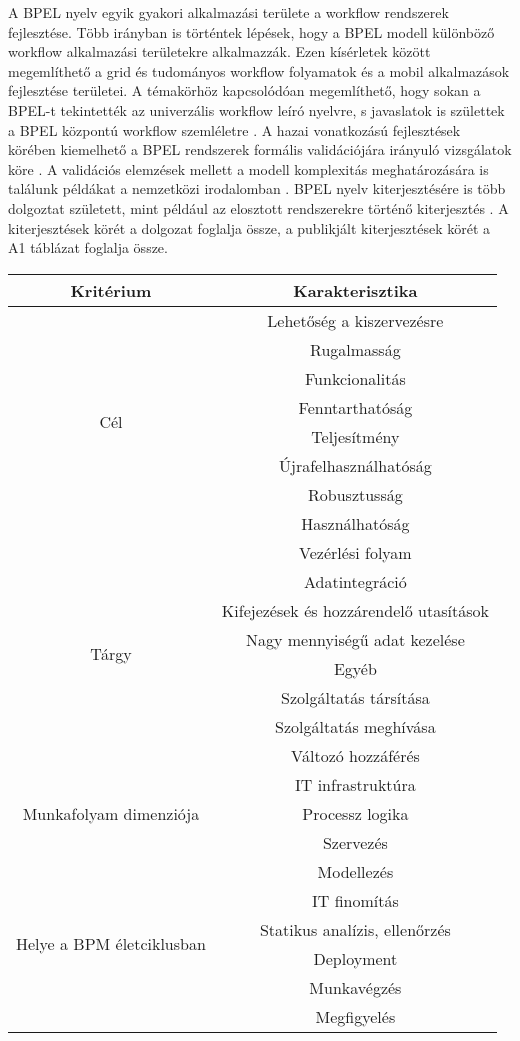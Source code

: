 A BPEL nyelv egyik gyakori alkalmazási területe a workflow rendszerek fejlesztése. Több irányban is történtek lépések, hogy  a BPEL  modell különböző workflow alkalmazási területekre alkalmazzák. Ezen kísérletek között megemlíthető a grid és tudományos  workflow folyamatok \cite{slominski2007adapting} és a mobil alkalmazások fejlesztése \cite{hackmann2006sliver} területei.  A témakörhöz kapcsolódóan megemlíthető, hogy sokan a BPEL-t tekintették az univerzális workflow leíró nyelvre, s javaslatok is születtek a BPEL központú workflow szemléletre \cite{van2008translating}. A  hazai vonatkozású fejlesztések körében kiemelhető a BPEL rendszerek formális validációjára irányuló vizsgálatok köre \cite{kovacs2008formal}. A validációs elemzések mellett a modell komplexitás meghatározására is találunk példákat a nemzetközi irodalomban  \cite{cardoso2007complexity}. 
\newpage
BPEL  nyelv kiterjesztésére is több dolgoztat született, mint például az elosztott rendszerekre történő kiterjesztés \cite{baresi2007towards}. A kiterjesztések körét a \cite{kopp2011classification} dolgozat foglalja össze, a publikjált kiterjesztések körét a A1 táblázat foglalja össze.
\begin{center}
\begin{tabular}{|c|c|}
\hline
\textbf{Kritérium} & \textbf{Karakterisztika}\\
\hline
\multirow{8}{7em}{Cél} & Lehetőség a kiszervezésre\\
& Rugalmasság\\
& Funkcionalitás\\
& Fenntarthatóság\\
& Teljesítmény\\
& Újrafelhasználhatóság\\
& Robusztusság\\
& Használhatóság\\
\hline
\multirow{8}{7em}{Tárgy} & Vezérlési folyam\\
& Adatintegráció\\
& Kifejezések és hozzárendelő utasítások\\
& Nagy mennyiségű adat kezelése\\
& Egyéb \\
& Szolgáltatás társítása\\
& Szolgáltatás meghívása\\
& Változó hozzáférés\\
\hline
\multirow{3}{7em}{Munkafolyam dimenziója} & IT infrastruktúra\\
& Processz logika\\
& Szervezés\\
\hline
\multirow{6}{7em}{Helye a BPM életciklusban} & Modellezés\\
& IT finomítás\\
& Statikus analízis, ellenőrzés\\
& Deployment\\
& Munkavégzés\\
& Megfigyelés\\
\hline
\end{tabular}
\end{center}

